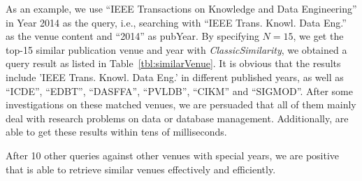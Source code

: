 As an example, we use ``IEEE Transactions on Knowledge and Data Engineering'' in Year 2014 as the query, i.e., searching with ``IEEE Trans. Knowl. Data Eng.'' as the \textsf{venue} content and ``2014'' as \textsf{pubYear}.  By specifying $N=15$, we get the top-15 similar publication venue and year with \textit{ClassicSimilarity}, we obtained a query result as listed in Table~\ref{tbl:similarVenue}. It is obvious that the results include 'IEEE Trans. Knowl. Data Eng.' in different published years,  as well as ``ICDE'', ``EDBT'', ``DASFFA'', ``PVLDB'', ``CIKM'' and ``SIGMOD''. After some investigations on these matched venues, we are persuaded that all of them mainly deal with research problems on data or database management. Additionally, {\SS} are able to get these results within tens of milliseconds.

After 10 other queries against other venues with special years, we are positive that {\SS} is able to retrieve similar venues effectively and efficiently.


